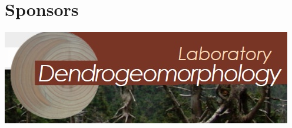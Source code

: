 \documentclass[
	openany, %
	parskip=false, %
	12pt, %
	a4paper, %
]{conferencebooklet} %
\begin{document}
\chapter{Sponsors}
\centering
\includegraphics[width=0.9\linewidth]{"images/logos/Partnerlogos/logo dendro"}


\vfill


\newpage

\thispagestyle{empty} %
\pagecolor{myblue} %
~

\end{document}
